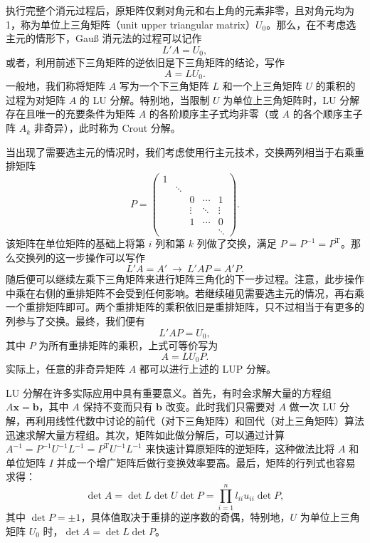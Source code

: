 执行完整个消元过程后，原矩阵仅剩对角元和右上角的元素非零，且对角元均为 1，称为单位上三角矩阵（unit upper triangular matrix）$U_0$。那么，在不考虑选主元的情形下，Gauß 消元法的过程可以记作
\begin{equation}
L'A=U_0,
\tag{3.1.12}
\end{equation}
或者，利用前述下三角矩阵的逆依旧是下三角矩阵的结论，写作
\begin{equation}
A=LU_0.
\tag{3.1.13}
\end{equation}
一般地，我们称将矩阵 $A$ 写为一个下三角矩阵 $L$ 和一个上三角矩阵 $U$ 的乘积的过程为对矩阵 $A$ 的 LU 分解。特别地，当限制 $U$ 为单位上三角矩阵时，LU 分解存在且唯一的充要条件为矩阵 $A$ 的各阶顺序主子式均非零（或 $A$ 的各个顺序主子阵 $A_k$ 非奇异），此时称为 Crout 分解。

当出现了需要选主元的情况时，我们考虑使用行主元技术，交换两列相当于右乘重排矩阵
\[
P=\begin{pmatrix}
1&&&&\\
&\ddots&&&\\
&&0&\cdots&1\\
&&\vdots&\ddots&\vdots\\
&&1&\cdots&0\\
&&&&\ddots
\end{pmatrix}.
\]
该矩阵在单位矩阵的基础上将第 $i$ 列和第 $k$ 列做了交换，满足 $P=P^{-1}=P^{\mathrm T}$。那么交换列的这一步操作可以写作
\begin{equation}
L'A=A'\ \longrightarrow\ L'AP=A'P.
\tag{3.1.14}
\end{equation}
随后便可以继续左乘下三角矩阵来进行矩阵三角化的下一步过程。注意，此步操作中乘在右侧的重排矩阵不会受到任何影响。若继续碰见需要选主元的情况，再右乘一个重排矩阵即可。两个重排矩阵的乘积依旧是重排矩阵，只不过相当于有更多的列参与了交换。最终，我们便有
\begin{equation}
L'AP=U_0,
\tag{3.1.15}
\end{equation}
其中 $P$ 为所有重排矩阵的乘积，上式可等价写为
\begin{equation}
A=LU_0P.
\tag{3.1.16}
\end{equation}
实际上，任意的非奇异矩阵 $A$ 都可以进行上述的 LUP 分解。

LU 分解在许多实际应用中具有重要意义。首先，有时会求解大量的方程组 $A\bm x=\bm b$，其中 $A$ 保持不变而只有 $\bm b$ 改变。此时我们只需要对 $A$ 做一次 LU 分解，再利用线性代数中讨论的前代（对下三角矩阵）和回代（对上三角矩阵）算法迅速求解大量方程组。其次，矩阵如此做分解后，可以通过计算 $A^{-1}=P^{-1}U^{-1}L^{-1}=P^{\mathrm T}U^{-1}L^{-1}$ 来快速计算原矩阵的逆矩阵，这种做法比将 $A$ 和单位矩阵 $I$ 并成一个增广矩阵后做行变换效率要高。最后，矩阵的行列式也容易求得：
\begin{equation}
\det A=\det L\det U\det P=\prod_{i=1}^n l_{ii}u_{ii}\det P,
\tag{3.1.17}
\end{equation}
其中 $\det P=\pm1$，具体值取决于重排的逆序数的奇偶，特别地，$U$ 为单位上三角矩阵 $U_0$ 时，$\det A=\det L\det P$。

